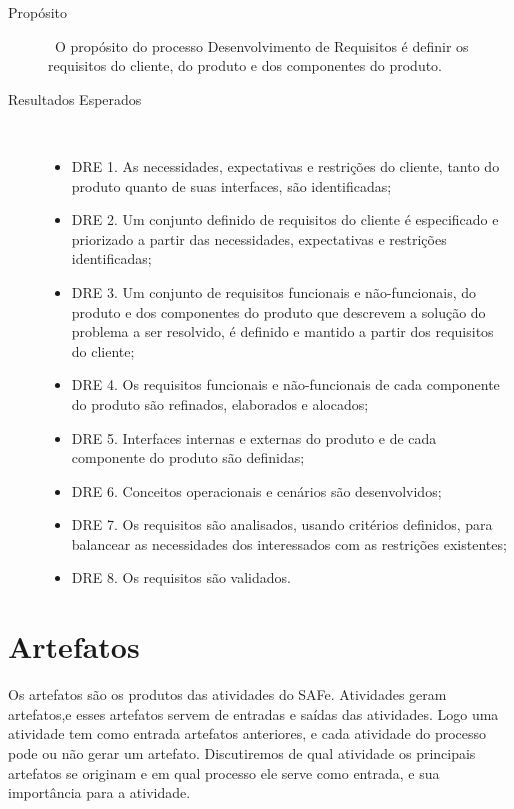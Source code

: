  \begin{description}
    \item [Propósito] \
     O propósito do processo Desenvolvimento de Requisitos é definir os requisitos
     do cliente, do produto e dos componentes do produto.
    \item [Resultados Esperados]\
      \begin{itemize}
        \item DRE 1. As necessidades, expectativas e restrições do cliente, tanto do produto
              quanto de suas interfaces, são identificadas;
        \item DRE 2. Um conjunto definido de requisitos do cliente é especificado e priorizado
              a partir das necessidades, expectativas e restrições identificadas;
        \item DRE 3. Um conjunto de requisitos funcionais e não-funcionais, do produto e dos componentes
                    do produto que descrevem a solução do problema a ser resolvido, é definido e mantido
                    a partir dos requisitos do cliente;
        \item DRE 4. Os requisitos funcionais e não-funcionais de cada componente do produto são
              refinados, elaborados e alocados;
        \item DRE 5. Interfaces internas e externas do produto e de cada componente do produto são
              definidas;
        \item DRE 6. Conceitos operacionais e cenários são desenvolvidos;
        \item DRE 7. Os requisitos são analisados, usando critérios definidos, para balancear
              as necessidades dos interessados com as restrições existentes;
        \item DRE 8. Os requisitos são validados.
      \end{itemize}
  \end{description}

\section{Artefatos}
  
  Os artefatos são os produtos das atividades do SAFe. Atividades geram artefatos,e esses artefatos servem de entradas e saídas das atividades. Logo uma atividade tem como entrada artefatos anteriores, e cada atividade do processo pode ou não gerar um artefato.
  Discutiremos de qual atividade os principais artefatos se originam e em qual processo ele serve como entrada, e sua importância para a atividade.


